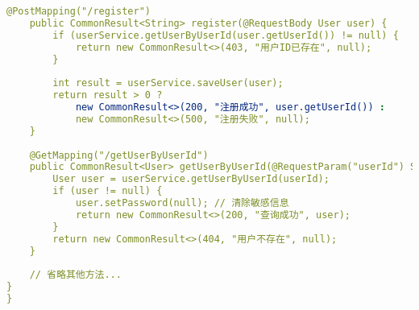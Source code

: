 \documentclass[a4paper,12pt]{article}
\begin{document}
\begin{lstlisting}[caption=用户服务bootstrap.yml配置,language=YAML]
    @PostMapping("/register")
    public CommonResult<String> register(@RequestBody User user) {
        if (userService.getUserByUserId(user.getUserId()) != null) {
            return new CommonResult<>(403, "用户ID已存在", null);
        }
        
        int result = userService.saveUser(user);
        return result > 0 ?
            new CommonResult<>(200, "注册成功", user.getUserId()) :
            new CommonResult<>(500, "注册失败", null);
    }
    
    @GetMapping("/getUserByUserId")
    public CommonResult<User> getUserByUserId(@RequestParam("userId") String userId) {
        User user = userService.getUserByUserId(userId);
        if (user != null) {
            user.setPassword(null); // 清除敏感信息
            return new CommonResult<>(200, "查询成功", user);
        }
        return new CommonResult<>(404, "用户不存在", null);
    }
    
    // 省略其他方法...
}
}
\end{lstlisting}
\end{document}
